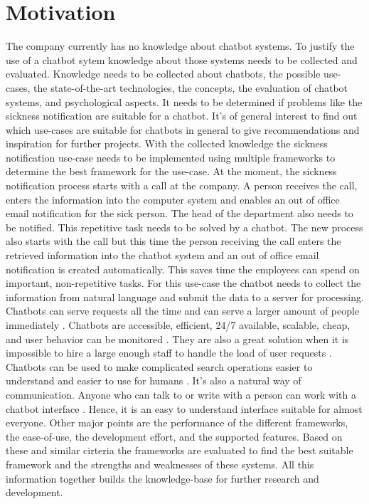 \section{Motivation} %
The company currently has no knowledge about chatbot systems.
To justify the use of a chatbot sytem knowledge about those systems needs to be collected and evaluated.
Knowledge needs to be collected about chatbots, the possible use-cases, the state-of-the-art technologies, the concepts, 
the evaluation of chatbot systems, and psychological aspects.
It needs to be determined if problems like the sickness notification are suitable for a chatbot.
It's of general interest to find out which use-cases are suitable for chatbots in general to give
recommendations and inspiration for further projects.
With the collected knowledge the sickness notification use-case needs to be implemented using multiple frameworks to determine 
the best framework for the use-case.
At the moment, the sickness notification process starts with a call at the company. 
A person receives the call, enters the information into the computer system and enables an out of office email 
notification for the sick person. 
The head of the department also needs to be notified. 
This repetitive task needs to be solved by a chatbot. 
The new process also starts with the call but this time the person receiving the call enters 
the retrieved information into the chatbot system and an out of office email 
notification is created automatically. 
This saves time the employees can spend on important, non-repetitive tasks.
For this use-case the chatbot needs to collect the information from natural language 
and submit the data to a server for processing.
Chatbots can serve requests all the time and can serve a larger amount of people immediately \cite{kane2016role}.
Chatbots are accessible, efficient, 24/7 available, scalable, cheap, and user behavior can be monitored \cite{buiildChatbotsPython}.
They are also a great solution when it is impossible to hire a large enough staff to handle the load of user requests \cite{kane2016role}.
Chatbots can be used to make complicated search operations easier to understand and easier to use for humans \cite{kane2016role}.
It's also a natural way of communication.
Anyone who can talk to or write with a person can work with a chatbot interface \cite{buiildChatbotsPython}.
Hence, it is an easy to understand interface suitable for almost everyone.
Other major points are the performance of the different frameworks, the ease-of-use, 
the development effort, and the supported features.
Based on these and similar cirteria the frameworks are evaluated to find the best suitable 
framework and the strengths and weaknesses of these systems.
All this information together builds the knowledge-base for further research and development.

